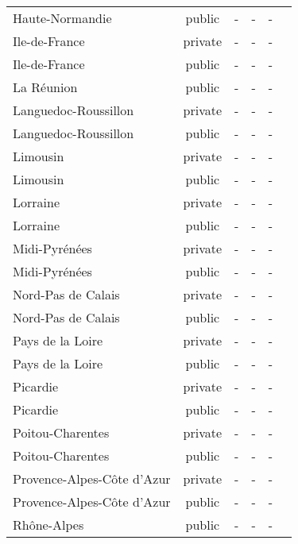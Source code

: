 \begin{table}[H]
\begin{tabularx}{\textwidth}{Xccccc}
            Haute-Normandie  & public & - & - & - \\
            Ile-de-France & private & - & - & - \\
            Ile-de-France & public & - & - & - \\
            La Réunion  & public & - & - & - \\
            Languedoc-Roussillon & private & - & - & - \\
            Languedoc-Roussillon & public & - & - & - \\
            Limousin & private & - & - & - \\
            Limousin & public & - & - & - \\
            Lorraine & private & - & - & - \\
            Lorraine & public & - & - & - \\
            Midi-Pyrénées & private & - & - & - \\
            Midi-Pyrénées & public & - & - & - \\
            Nord-Pas de Calais & private & - & - & - \\
            Nord-Pas de Calais & public & - & - & - \\
            Pays de la Loire & private & - & - & - \\
            Pays de la Loire & public & - & - & - \\
            Picardie & private & - & - & - \\
            Picardie & public & - & - & - \\
            Poitou-Charentes & private & - & - & - \\
            Poitou-Charentes & public & - & - & - \\
            Provence-Alpes-Côte d’Azur & private & - & - & - \\
            Provence-Alpes-Côte d’Azur & public & - & - & - \\
            Rhône-Alpes & public & - & - & - \\
        \bottomrule
    \end{tabularx}
\end{table}
    